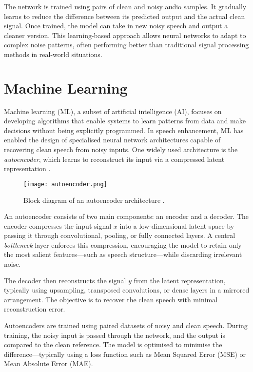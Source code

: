 The network is trained using pairs of clean and noisy audio samples. It gradually learns to reduce the difference between its predicted output and the actual clean signal. Once trained, the model can take in new noisy speech and output a cleaner version. This learning-based approach allows neural networks to adapt to complex noise patterns, often performing better than traditional signal processing methods in real-world situations.

\section{Machine Learning}
\label{sec:machine_learning}

Machine learning (ML), a subset of artificial intelligence (AI), focuses on developing algorithms that enable systems to learn patterns from data and make decisions without being explicitly programmed. In speech enhancement, ML has enabled the design of specialised neural network architectures capable of recovering clean speech from noisy inputs. One widely used architecture is the \textit{autoencoder}, which learns to reconstruct its input via a compressed latent representation \cite{azarang2020review}.

\begin{figure}[h]
    \centering
    \texttt{[image: autoencoder.png]}
    \caption{\label{fig:autoencoder} Block diagram of an autoencoder architecture \cite{vachhani2017dae}.}
\end{figure}

An autoencoder consists of two main components: an encoder and a decoder. The encoder compresses the input signal \(x\) into a low-dimensional latent space by passing it through convolutional, pooling, or fully connected layers. A central \textit{bottleneck} layer enforces this compression, encouraging the model to retain only the most salient features—such as speech structure—while discarding irrelevant noise.

The decoder then reconstructs the signal \(y\) from the latent representation, typically using upsampling, transposed convolutions, or dense layers in a mirrored arrangement. The objective is to recover the clean speech with minimal reconstruction error.

Autoencoders are trained using paired datasets of noisy and clean speech. During training, the noisy input is passed through the network, and the output is compared to the clean reference. The model is optimised to minimise the difference—typically using a loss function such as Mean Squared Error (MSE) or Mean Absolute Error (MAE).

